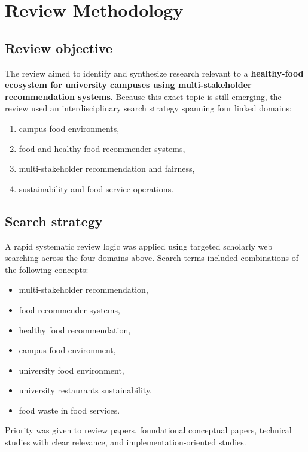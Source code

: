 \section{Review Methodology}\label{review-methodology}

\subsection{Review objective}\label{review-objective}

The review aimed to identify and synthesize research relevant to a
\textbf{healthy-food ecosystem for university campuses using
multi-stakeholder recommendation systems}. Because this exact topic is
still emerging, the review used an interdisciplinary search strategy
spanning four linked domains:

\begin{enumerate}
\def\labelenumi{\arabic{enumi}.}
\tightlist
\item
  campus food environments,
\item
  food and healthy-food recommender systems,
\item
  multi-stakeholder recommendation and fairness,
\item
  sustainability and food-service operations.
\end{enumerate}

\subsection{Search strategy}\label{search-strategy}

A rapid systematic review logic was applied using targeted scholarly web
searching across the four domains above. Search terms included
combinations of the following concepts:

\begin{itemize}
\tightlist
\item
  multi-stakeholder recommendation,
\item
  food recommender systems,
\item
  healthy food recommendation,
\item
  campus food environment,
\item
  university food environment,
\item
  university restaurants sustainability,
\item
  food waste in food services.
\end{itemize}

Priority was given to review papers, foundational conceptual papers,
technical studies with clear relevance, and implementation-oriented
studies.

